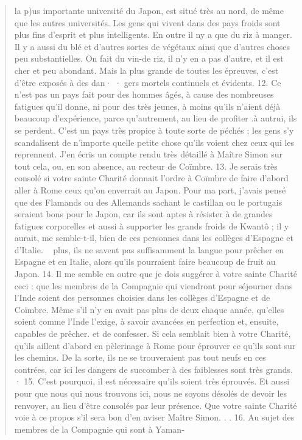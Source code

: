 \begin{quote}
    la p)us importante université du Japon, est situé très au nord, de
même que les autres universités. Les gens qui vivent dans des pays
froids sont plus fins d'esprit et plus intelligents. En outre il ny a
que du riz à manger. Il y a aussi du blé et d'autres sortes de végétaux
ainsi que d'autres choses peu substantielles. On fait du vin-de
riz, il n'y en a pas d'autre, et il est cher et peu abondant. Mais la
plus grande de toutes les épreuves, c'est d'être exposés à des dan· ·
gers mortels continuels et évidents.
12. Ce n'est pas un pays fait pour des hommes âgés, à cause des
nombreuses fatigues qu'il donne, ni pour des très jeunes, à moins
qu'ils n'aient déjà beaucoup d'expérience, parce qu'autrement, au
lieu de profiter .à autrui, ils se perdent. C'est un pays très propice
à toute sorte de péchés ; les gens s'y scandalisent de n'importe
quelle petite chose qu'ils voient chez ceux qui les reprennent. J'en
écris un compte rendu très détaillé à Maître Simon sur tout cela,
ou, en son absence, au recteur de Coïmbre.
13. Je serais très consolé si votre sainte Charité donnait l'ordre
à Coïmbre de faire d'abord aller à Rome ceux qu'on enverrait au
Japon. Pour ma part, j'avais pensé que des Flamands ou des Allemands
sachant le castillan ou le portugais seraient bons pour le
Japon, car ils sont aptes à résister à de grandes fatigues corporelles
et aussi à supporter les grands froids de Kwantô ; il y aurait,
me semble-t-il, bien de ces personnes dans les collèges d'Espagne
et d'Italie. ~ plus, ils ne savent pas suffisamment la langue pour
prêcher en Espagne et en Italie, alors qu'ils pourraient faire beaucoup
de fruit au Japon.
14. Il me semble en outre que je dois suggérer à votre sainte
Charité ceci : que les membres de la Compagnie qui viendront pour
séjourner dans l'Inde soient des personnes choisies dans les collèges
d'Espagne et de Coïmbre. Même s'il n'y en avait pas plus de
deux chaque année, qu'elles soient comme l'Inde l'exige, à savoir
avancées en perfection et, ensuite, capables de prêcher. et de
confesser. Si cela semblait bien à votre Charité, qu'ils aillent
d'abord en pèlerinage à Rome pour éprouver ce qu'ils sont sur les
chemins. De la sorte, ils ne se trouveraient pas tout neufs en ces
contrées, car ici les dangers de succomber à des faiblesses sont très
grands. ·
15. C'est pourquoi, il est nécessaire qu'ils soient très éprouvés.
Et aussi pour que nous qui nous trouvons ici, nous ne soyons désolés
de devoir les renvoyer, au lieu d'être consolés par leur présence.
Que votre sainte Charité voie à ce propos s'il sera bon d'en aviser
Maître Simon. . .
16. Au sujet des membres de la Compagnie qui sont à Yaman-
\end{quote}

